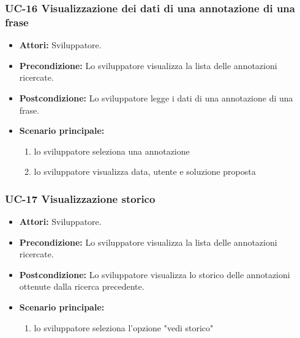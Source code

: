	\subsubsection{UC-16 Visualizzazione dei dati di una annotazione di una frase}
		\begin{itemize}
			\item \textbf{Attori:} Sviluppatore.
			\item \textbf{Precondizione:} Lo sviluppatore visualizza la lista delle annotazioni ricercate.
			\item \textbf{Postcondizione:} Lo sviluppatore legge i dati di una annotazione di una frase.
			\item \textbf{Scenario principale:}
				\begin{enumerate}
					\item lo sviluppatore seleziona una annotazione
					\item lo sviluppatore visualizza data, utente e soluzione proposta
				\end{enumerate}
		\end{itemize}
	
	\subsubsection{UC-17 Visualizzazione storico}		
		\begin{itemize}
			\item \textbf{Attori:} Sviluppatore.
			\item \textbf{Precondizione:} Lo sviluppatore visualizza la lista delle annotazioni ricercate.
			\item \textbf{Postcondizione:} Lo sviluppatore visualizza lo storico delle annotazioni ottenute dalla ricerca precedente.
			\item \textbf{Scenario principale:}
			\begin{enumerate}
				\item lo sviluppatore seleziona l'opzione "vedi storico"
			\end{enumerate}
		\end{itemize}	
		
